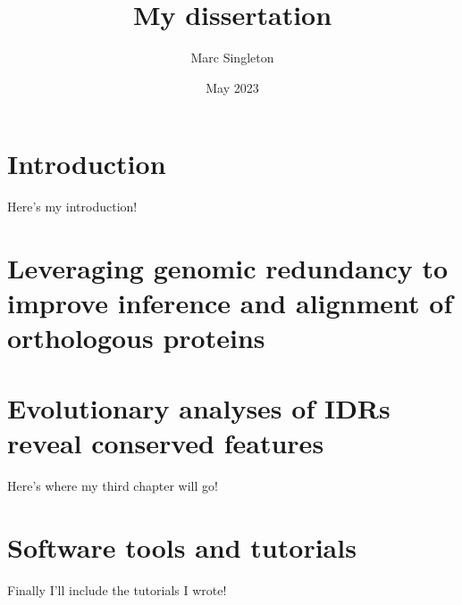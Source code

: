 \documentclass[11pt,letterpaper,oneside]{book}
\begin{document}
\title{My dissertation}
\author{Marc Singleton}
\date{May 2023}
\maketitle

\tableofcontents

\chapter{Introduction}
\graphicspath{{introduction/figures/}}
Here's my introduction!

\lipsum[1-5]

\chapter{Leveraging genomic redundancy to improve inference and alignment of orthologous proteins}
\graphicspath{{chapter1/figures/}}

\clearpage
\setcounter{figure}{0}
\renewcommand{\thefigure}{S\arabic{figure}}

\renewcommand{\thefigure}{\arabic{chapter}.\arabic{figure}}

\chapter{Evolutionary analyses of IDRs reveal conserved features}
Here's where my third chapter will go!

\lipsum[6-8]

\chapter{Software tools and tutorials}
Finally I'll include the tutorials I wrote!

\lipsum[9-10]

\printbibliography[heading=bibintoc]
\end{document}
